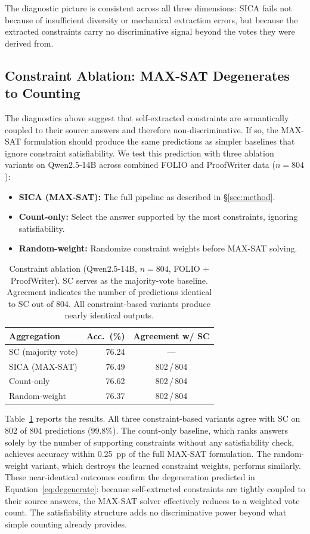 The diagnostic picture is consistent across all three dimensions: SICA fails not because of insufficient diversity or mechanical extraction errors, but because the extracted constraints carry no discriminative signal beyond the votes they were derived from.


\subsection{Constraint Ablation: MAX-SAT Degenerates to Counting}
\label{sec:ablation}

The diagnostics above suggest that self-extracted constraints are semantically coupled to their source answers and therefore non-discriminative. If so, the MAX-SAT formulation should produce the same predictions as simpler baselines that ignore constraint satisfiability. We test this prediction with three ablation variants on Qwen2.5-14B across combined FOLIO and ProofWriter data ($n = 804$):

\begin{itemize}
\item \textbf{SICA (MAX-SAT):} The full pipeline as described in \S\ref{sec:method}.
\item \textbf{Count-only:} Select the answer supported by the most constraints, ignoring satisfiability.
\item \textbf{Random-weight:} Randomize constraint weights before MAX-SAT solving.
\end{itemize}

\begin{table}[t]
\centering
\small
\caption{Constraint ablation (Qwen2.5-14B, $n = 804$, FOLIO + ProofWriter). SC serves as the majority-vote baseline. Agreement indicates the number of predictions identical to SC out of 804. All constraint-based variants produce nearly identical outputs.}
\label{tab:ablation}
\begin{tabular}{@{}lrc@{}}
\toprule
Aggregation & Acc.\ (\%) & Agreement w/ SC \\
\midrule
SC (majority vote) & 76.24 & --- \\
SICA (MAX-SAT) & 76.49 & 802\,/\,804 \\
Count-only & 76.62 & 802\,/\,804 \\
Random-weight & 76.37 & 802\,/\,804 \\
\bottomrule
\end{tabular}
\end{table}

Table~\ref{tab:ablation} reports the results. All three constraint-based variants agree with SC on 802 of 804 predictions (99.8\%). The count-only baseline, which ranks answers solely by the number of supporting constraints without any satisfiability check, achieves accuracy within 0.25~pp of the full MAX-SAT formulation. The random-weight variant, which destroys the learned constraint weights, performs similarly. These near-identical outcomes confirm the degeneration predicted in Equation~\ref{eq:degenerate}: because self-extracted constraints are tightly coupled to their source answers, the MAX-SAT solver effectively reduces to a weighted vote count. The satisfiability structure adds no discriminative power beyond what simple counting already provides.

